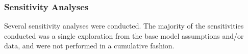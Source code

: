 \documentclass[11pt,
  english,
  a4paper,
]{article}
\begin{document}

\hypertarget{sensitivity-analyses}{%
\subsubsection{Sensitivity Analyses}\label{sensitivity-analyses}}

\leavevmode\tagmcend\tagstructend


Several sensitivity analyses were conducted. The majority of the sensitivities conducted was a single exploration from the base model assumptions and/or data, and were not performed in a cumulative fashion.

\leavevmode\tagmcend\tagstructend\par
\end{document}
